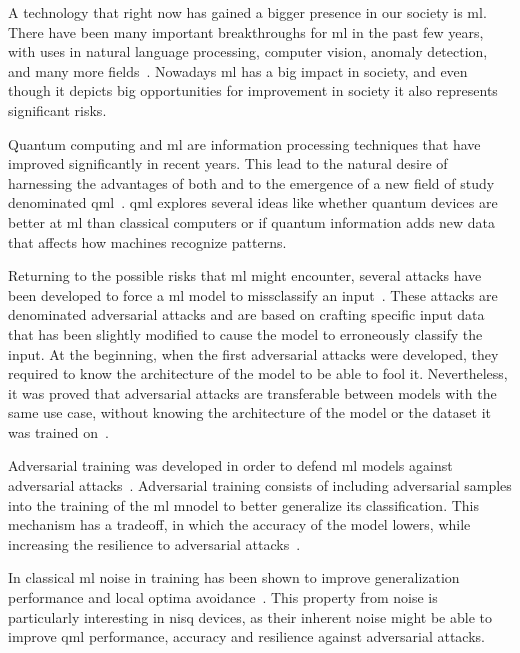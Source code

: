 A technology that right now has gained a bigger presence in our society is \ac{ml}.
There have been many important breakthroughs for \ac{ml} in the past few years, with
uses in natural language processing, computer vision, anomaly detection, and many
more fields~\cite{bommasani_opportunities_2022}. Nowadays \ac{ml} has a big impact
in society, and even though it depicts big opportunities for improvement in
society it also represents significant risks. \

Quantum computing and \ac{ml} are information processing techniques that have
improved significantly in recent years. This lead to the natural desire of
harnessing the advantages of both and to the emergence of a new field of study
denominated \ac{qml}~\cite{schuld_machine_2021}. \ac{qml} explores several ideas
like whether quantum devices are better at \ac{ml} than classical computers or
if quantum information adds new data that affects how machines recognize patterns. \

Returning to the possible risks that \ac{ml} might encounter, several attacks have
been developed to force a \ac{ml} model to missclassify an input~\cite{szegedy_intriguing_2014}.
These attacks are denominated adversarial attacks and are based on crafting specific
input data that has been slightly modified to cause the model to erroneously classify
the input. At the beginning, when the first adversarial attacks were developed,
they required to know the architecture of the model to be able to fool it.
Nevertheless, it was proved that adversarial attacks are transferable between
models with the same use case, without knowing the architecture of the model or
the dataset it was trained on~\cite{papernot_transferability_2016}. \

Adversarial training was developed in order to defend \ac{ml} models against
adversarial attacks~\cite{goodfellow_explaining_2015, szegedy_intriguing_2014}.
Adversarial training consists of including adversarial samples into the training
of the \ac{ml} mnodel to better generalize its classification. This mechanism
has a tradeoff, in which the accuracy of the model lowers, while increasing the
resilience to adversarial attacks~\cite{kurakin_adversarial_2017}. \

In classical \ac{ml} noise in training has been shown to improve generalization
performance and local optima avoidance~\cite{ciliberto_quantum_2018}. This
property from noise is particularly interesting in \ac{nisq} devices, as their
inherent noise might be able to improve \ac{qml} performance, accuracy and
resilience against adversarial attacks. \

